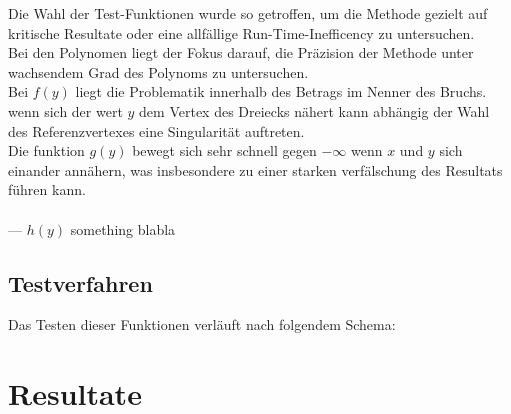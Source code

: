 \documentclass[12pt]{article}
\begin{document}
Die Wahl der Test-Funktionen wurde so getroffen, um die Methode gezielt auf kritische Resultate oder eine allfällige Run-Time-Inefficency zu untersuchen.\\
Bei den Polynomen liegt der Fokus darauf, die Präzision der Methode unter wachsendem Grad des Polynoms zu untersuchen.
\\
Bei $f(y)$ liegt die Problematik innerhalb des Betrags im Nenner des Bruchs. wenn sich der wert $y$ dem Vertex des Dreiecks nähert kann abhängig der Wahl des Referenzvertexes eine Singularität auftreten.\\
Die funktion $g(y)$ bewegt sich sehr schnell gegen $-\infty$ wenn $x$ und $y$ sich einander annähern, was insbesondere zu einer starken verfälschung des Resultats führen kann.\\
\\
--- $h(y)$ something blabla
\\

\subsection{Testverfahren}

Das Testen dieser Funktionen verläuft nach folgendem Schema: \\
\begin{center}
\end{center}



\newpage

\section{Resultate}

\newpage
\end{document}
